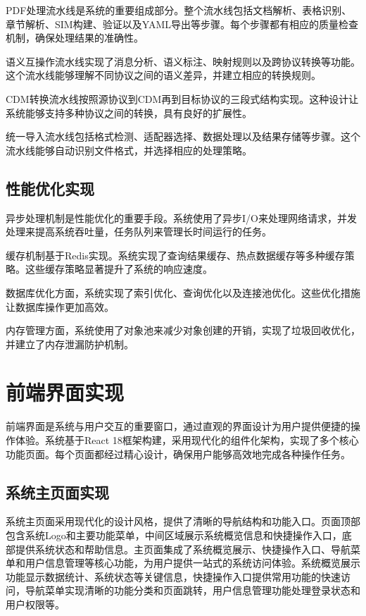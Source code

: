 PDF处理流水线是系统的重要组成部分。整个流水线包括文档解析、表格识别、章节解析、SIM构建、验证以及YAML导出等步骤。每个步骤都有相应的质量检查机制，确保处理结果的准确性。

语义互操作流水线实现了消息分析、语义标注、映射规则以及跨协议转换等功能。这个流水线能够理解不同协议之间的语义差异，并建立相应的转换规则。

CDM转换流水线按照源协议到CDM再到目标协议的三段式结构实现。这种设计让系统能够支持多种协议之间的转换，具有良好的扩展性。

统一导入流水线包括格式检测、适配器选择、数据处理以及结果存储等步骤。这个流水线能够自动识别文件格式，并选择相应的处理策略。

\subsection{性能优化实现}

异步处理机制是性能优化的重要手段。系统使用了异步I/O来处理网络请求，并发处理来提高系统吞吐量，任务队列来管理长时间运行的任务。

缓存机制基于Redis实现。系统实现了查询结果缓存、热点数据缓存等多种缓存策略。这些缓存策略显著提升了系统的响应速度。

数据库优化方面，系统实现了索引优化、查询优化以及连接池优化。这些优化措施让数据库操作更加高效。

内存管理方面，系统使用了对象池来减少对象创建的开销，实现了垃圾回收优化，并建立了内存泄漏防护机制。

\section{前端界面实现}

前端界面是系统与用户交互的重要窗口，通过直观的界面设计为用户提供便捷的操作体验。系统基于React 18框架构建，采用现代化的组件化架构，实现了多个核心功能页面。每个页面都经过精心设计，确保用户能够高效地完成各种操作任务。

\subsection{系统主页面实现}

系统主页面采用现代化的设计风格，提供了清晰的导航结构和功能入口。页面顶部包含系统Logo和主要功能菜单，中间区域展示系统概览信息和快捷操作入口，底部提供系统状态和帮助信息。主页面集成了系统概览展示、快捷操作入口、导航菜单和用户信息管理等核心功能，为用户提供一站式的系统访问体验。系统概览展示功能显示数据统计、系统状态等关键信息，快捷操作入口提供常用功能的快速访问，导航菜单实现清晰的功能分类和页面跳转，用户信息管理功能处理登录状态和用户权限等。


